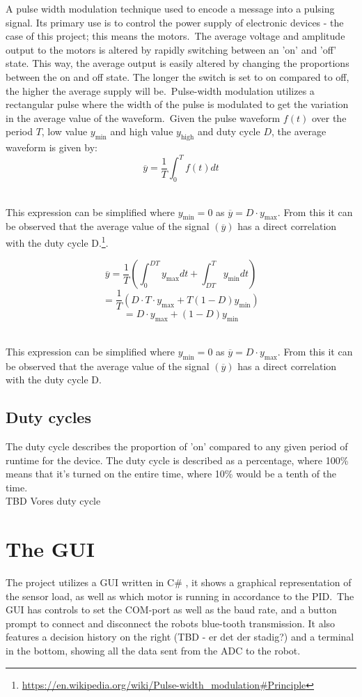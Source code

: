 A pulse width modulation technique used to encode a message into a pulsing signal. Its primary use is to control the power supply of electronic devices - the case of this project; this means the motors.\
The average voltage and amplitude output to the motors is altered by rapidly switching between an 'on' and 'off' state. This way, the average output is easily altered by changing the proportions between the on and off state. The longer the switch is set to on compared to off, the higher the average supply will be.\
Pulse-width modulation utilizes a rectangular pulse where the width of the pulse is modulated to get the variation in the average value of the waveform.\ Given the pulse waveform $f(t)$ over the period $T$, low value $y_\mathrm{min}$ and high value $y_\mathrm{high}$ and duty cycle $D$, the average waveform is given by: \\

$$\overline{y}=\frac{1}{T}\int_{0}^{T}f(t)dt$$\

This expression can be simplified where $y_\mathrm{min}=0$ as $\overline{y}=D \cdot y_\mathrm{max}$. From this it can be observed that the average value of the signal $(\overline{y})$ has a direct correlation with the duty cycle D.\footnote{\url{https://en.wikipedia.org/wiki/Pulse-width_modulation\#Principle}}.
 
 $$\overline{y}=\frac{1}{T}\left(\int_{0}^{DT}y_\mathrm{max}dt+\int_{DT}^{T}y_\mathrm{min}dt\right)$$
 $$=\frac{1}{T}\left(D \cdot T \cdot y_\mathrm{max}+T(1-D)y_\mathrm{min}\right)$$
 $$=D \cdot y_\mathrm{max}+\left(1-D\right)y_\mathrm{min}$$\
 
This expression can be simplified where $y_\mathrm{min}=0$ as $\overline{y}=D \cdot y_\mathrm{max}$. From this it can be observed that the average value of the signal $(\overline{y})$ has a direct correlation with the duty cycle D. 

\subsection{Duty cycles}
The duty cycle describes the proportion of 'on' compared to any given period of runtime for the device. The duty cycle is described as a percentage, where 100\% means that it's turned on the entire time, where 10\% would be a tenth of the time.\\
TBD Vores duty cycle

\section{The GUI}
The project utilizes a GUI written in C\# , it shows a graphical representation of the sensor load, as well as which motor is running in accordance to the PID.\
The GUI has controls to set the COM-port as well as the baud rate, and a button prompt to connect and disconnect the robots blue-tooth transmission. It also features a decision history on the right (TBD - er det der stadig?) and a terminal in the bottom, showing all the data sent from the ADC to the robot.


